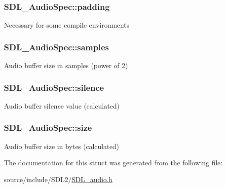 \subsubsection[{padding}]{ S\+D\+L\+\_\+\+Audio\+Spec\+::padding}\label{struct_s_d_l___audio_spec_a738371fc13b54cefef4db16994abeeb6}
Necessary for some compile environments \hypertarget{struct_s_d_l___audio_spec_a2cdf5e885808c10bfa2810b706e69f95}{}
\subsubsection[{samples}]{ S\+D\+L\+\_\+\+Audio\+Spec\+::samples}\label{struct_s_d_l___audio_spec_a2cdf5e885808c10bfa2810b706e69f95}
Audio buffer size in samples (power of 2) \hypertarget{struct_s_d_l___audio_spec_addc462c8a806e6c122eccf63482048f6}{}
\subsubsection[{silence}]{ S\+D\+L\+\_\+\+Audio\+Spec\+::silence}\label{struct_s_d_l___audio_spec_addc462c8a806e6c122eccf63482048f6}
Audio buffer silence value (calculated) \hypertarget{struct_s_d_l___audio_spec_a154cf44743ecec78c36dc6c827dd2fdb}{}
\subsubsection[{size}]{ S\+D\+L\+\_\+\+Audio\+Spec\+::size}\label{struct_s_d_l___audio_spec_a154cf44743ecec78c36dc6c827dd2fdb}
Audio buffer size in bytes (calculated) 

The documentation for this struct was generated from the following file\+:\begin{DoxyCompactItemize}
\item 
source/include/\+S\+D\+L2/\hyperlink{_s_d_l__audio_8h}{S\+D\+L\+\_\+audio.\+h}\end{DoxyCompactItemize}
